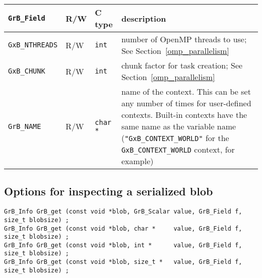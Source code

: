 \noindent
{\small
\begin{tabular}{|l|l|l|p{3.5in}|}
\hline
\verb'GrB_Field'                    & R/W  & C type        & description \\
\hline
\verb'GxB_NTHREADS' & R/W & \verb'int' & number of OpenMP threads to use;
    See Section~\ref{omp_parallelism} \\
\verb'GxB_CHUNK'    & R/W & \verb'int' & chunk factor for task creation;
    See Section~\ref{omp_parallelism} \\
\hline
\verb'GrB_NAME'         & R/W  & \verb'char *' & name of the context.
    This can be set any number of times for user-defined contexts.  Built-in
    contexts have the same name as the variable name (\verb'"GxB_CONTEXT_WORLD"'
    for the \verb'GxB_CONTEXT_WORLD' context, for example) \\
\hline
\end{tabular}
}

\newpage
\subsection{Options for inspecting a serialized blob}
\label{get_set_blob}

\begin{mdframed}[userdefinedwidth=6.5in]
{\footnotesize
\begin{verbatim}
GrB_Info GrB_get (const void *blob, GrB_Scalar value, GrB_Field f, size_t blobsize) ;
GrB_Info GrB_get (const void *blob, char *     value, GrB_Field f, size_t blobsize) ;
GrB_Info GrB_get (const void *blob, int *      value, GrB_Field f, size_t blobsize) ;
GrB_Info GrB_get (const void *blob, size_t *   value, GrB_Field f, size_t blobsize) ;
\end{verbatim}
}\end{mdframed}

